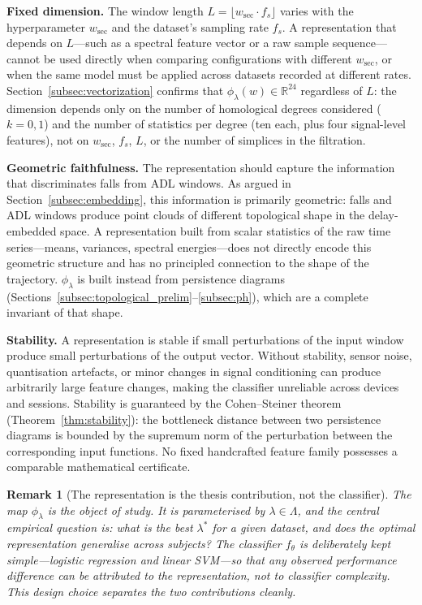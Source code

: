 \documentclass[onluarkali,ingilizce,yukseklisans,karton,LisansustuEgitim]{itutez}
\newtheorem{remark}{Remark}[chapter]
\providecommand{\R}{\mathbb{R}}
\providecommand{\1}{\mathbf{1}}
\begin{document}
\textbf{Fixed dimension.} The window length $L=\lfloor w_{\mathrm{sec}}\cdot f_s\rfloor$ varies with the hyperparameter $w_{\mathrm{sec}}$ and the dataset's sampling rate $f_s$. A representation that depends on $L$---such as a spectral feature vector or a raw sample sequence---cannot be used directly when comparing configurations with different $w_{\mathrm{sec}}$, or when the same model must be applied across datasets recorded at different rates. Section~\ref{subsec:vectorization} confirms that $\phi_\lambda(w)\in\R^{24}$ regardless of $L$: the dimension depends only on the number of homological degrees considered ($k=0,1$) and the number of statistics per degree (ten each, plus four signal-level features), not on $w_{\mathrm{sec}}$, $f_s$, $L$, or the number of simplices in the filtration.

\textbf{Geometric faithfulness.} The representation should capture the information that discriminates falls from ADL windows. As argued in Section~\ref{subsec:embedding}, this information is primarily geometric: falls and ADL windows produce point clouds of different topological shape in the delay-embedded space. A representation built from scalar statistics of the raw time series---means, variances, spectral energies---does not directly encode this geometric structure and has no principled connection to the shape of the trajectory. $\phi_\lambda$ is built instead from persistence diagrams (Sections~\ref{subsec:topological_prelim}--\ref{subsec:ph}), which are a complete invariant of that shape.

\textbf{Stability.} A representation is stable if small perturbations of the input window produce small perturbations of the output vector. Without stability, sensor noise, quantisation artefacts, or minor changes in signal conditioning can produce arbitrarily large feature changes, making the classifier unreliable across devices and sessions. Stability is guaranteed by the Cohen--Steiner theorem (Theorem~\ref{thm:stability}): the bottleneck distance between two persistence diagrams is bounded by the supremum norm of the perturbation between the corresponding input functions. No fixed handcrafted feature family possesses a comparable mathematical certificate.

\begin{remark}[The representation is the thesis contribution, not the classifier]
\label{rem:repr-is-contribution}
The map $\phi_\lambda$ is the object of study. It is parameterised by $\lambda\in\Lambda$, and the central empirical question is: what is the best $\lambda^*$ for a given dataset, and does the optimal representation generalise across subjects? The classifier $f_\theta$ is deliberately kept simple---logistic regression and linear SVM---so that any observed performance difference can be attributed to the representation, not to classifier complexity. This design choice separates the two contributions cleanly.
\end{remark}
\end{document}
